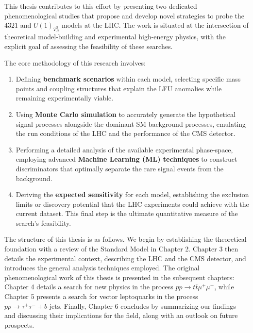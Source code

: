 This thesis contributes to this effort by presenting two dedicated phenomenological studies that propose and develop novel strategies to probe the $4321$ and $U(1)_{T^3_R}$ models at the LHC. The work is situated at the intersection of theoretical model-building and experimental high-energy physics, with the explicit goal of assessing the feasibility of these searches.

The core methodology of this research involves:
\begin{enumerate}
    \item Defining \textbf{benchmark scenarios} within each model, selecting specific mass points and coupling structures that explain the LFU anomalies while remaining experimentally viable.
    \item Using \textbf{Monte Carlo simulation} to accurately generate the hypothetical signal processes alongside the dominant SM background processes, emulating the run conditions of the LHC and the performance of the CMS detector.
    \item Performing a detailed analysis of the available experimental phase-space, employing advanced \textbf{Machine Learning (ML) techniques} to construct discriminators that optimally separate the rare signal events from the background.
    \item Deriving the \textbf{expected sensitivity} for each model, establishing the exclusion limits or discovery potential that the LHC experiments could achieve with the current dataset. This final step is the ultimate quantitative measure of the search's feasibility.
\end{enumerate}

The structure of this thesis is as follows. We begin by establishing the theoretical foundation with a review of the Standard Model in Chapter 2. Chapter 3 then details the experimental context, describing the LHC and the CMS detector, and introduces the general analysis techniques employed. The original phenomenological work of this thesis is presented in the subsequent chapters: Chapter 4 details a search for new physics in the process $pp \to t\bar{t}\mu^+\mu^-$, while Chapter 5 presents a search for vector leptoquarks in the process $pp \to \tau^+\tau^- + b\text{-jets}$. Finally, Chapter 6 concludes by summarizing our findings and discussing their implications for the field, along with an outlook on future prospects.